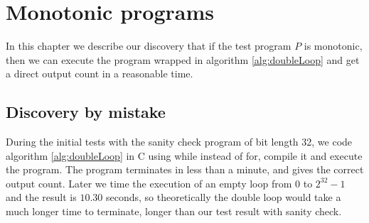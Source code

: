 \chapter{Monotonic programs}
	\label{CH_04}
	
In this chapter we describe our discovery that if the test program $P$ is monotonic, then we can execute the program wrapped in algorithm \ref{alg:doubleLoop} and get a direct output count in a reasonable time.

\section{Discovery by mistake}
During the initial tests with the sanity check program of bit length 32, we code algorithm \ref{alg:doubleLoop} in C using while instead of for, compile it and execute the program. The program terminates in less than a minute, and gives the correct output count. Later we time the execution of an empty loop from $0$ to $2^{32} - 1$ and the result is $10.30$ seconds, so theoretically the double loop would take a much longer time to terminate, longer than our test result with sanity check. 
